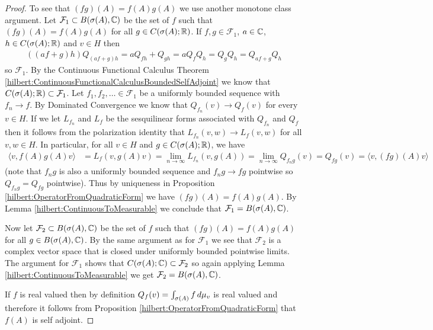 \begin{proof}
To see that $(fg)(A) = f(A) g(A)$ we use another monotone class argument.  Let $\mathcal{F}_1 \subset B(\sigma(A), \mathbb{C})$ be the set of $f$ such that $(fg)(A) = f(A) g(A)$ for all $g \in C(\sigma(A); \mathbb{R})$.  If $f,g \in \mathcal{F}_1$, $a \in \mathbb{C}$, $h \in C(\sigma(A); \mathbb{R})$ and $v \in H$ then
\begin{align*}
((af + g) h)Q_{(af +g)h} = a Q_{fh} + Q_{gh} = a Q_f Q_h = Q_g Q_h = Q_{af+g} Q_h 
\end{align*}
so $\mathcal{F}_1$.  By the Continuous Functional Calculus Theorem \ref{hilbert:ContinuousFunctionalCalculusBoundedSelfAdjoint} we know that $C(\sigma(A); \mathbb{R}) \subset \mathcal{F}_1$.  Let $f_1, f_2, \dotsc \in \mathcal{F}_1$ be a uniformly bounded sequence with $f_n \to f$.  By Dominated Convergence we know that $Q_{f_n}(v) \to Q_f(v)$ for every $v \in H$.  If we let $L_{f_n}$ and $L_f$ be the sesquilinear forms associated with $Q_{f_n}$ and $Q_f$ then it follows from the polarization identity that $L_{f_n}(v,w)  \to L_f(v,w)$ for all $v,w \in H$.  In particular, for all $v \in H$ and $g \in C(\sigma(A); \mathbb{R})$, we have 
\begin{align*}
\langle v, f(A)g(A) v \rangle &= L_f(v, g(A)v) = \lim_{n \to \infty} L_{f_n}(v, g(A)) = \lim_{n \to \infty} Q_{f_ng}(v) = Q_{fg}(v) = \langle v, (fg)(A) v \rangle
\end{align*}
(note that $f_n g$ is also a uniformly bounded sequence and $f_n g \to fg$ pointwise so $Q_{f_ng} = Q_{fg}$ pointwise).  Thus by uniqueness in Proposition \ref{hilbert:OperatorFromQuadraticForm} we have $(fg)(A) = f(A) g(A)$. By Lemma \ref{hilbert:ContinuousToMeasurable} we conclude that $\mathcal{F}_1 = B(\sigma(A), \mathbb{C})$.

Now let $\mathcal{F}_2 \subset B(\sigma(A), \mathbb{C})$ be the set of $f$ such that $(fg)(A) = f(A) g(A)$ for all $g \in B(\sigma(A), \mathbb{C})$.  By the same argument as for $\mathcal{F}_1$ we see that $\mathcal{F}_2$ is a complex vector space that is closed under uniformly bounded pointwise limits.  The argument for $\mathcal{F}_1$ shows that $C(\sigma(A); \mathbb{C}) \subset \mathcal{F}_2$ so again applying Lemma \ref{hilbert:ContinuousToMeasurable}  we get $\mathcal{F}_2 = B(\sigma(A), \mathbb{C})$.

If $f$ is real valued then by definition $Q_f(v) = \int_{\sigma(A)} f \, d\mu_v$ is real valued and therefore it follows from Proposition \ref{hilbert:OperatorFromQuadraticForm} that $f(A)$ is self adjoint.
\end{proof}

